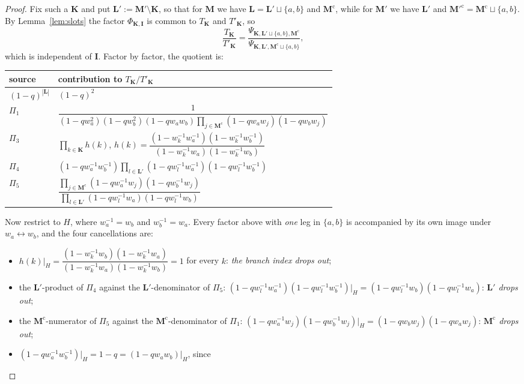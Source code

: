 \documentclass[11pt]{article}
\theoremstyle{plain}
\theoremstyle{definition}
\theoremstyle{remark}
\theoremstyle{plain}
\newcommand{\bI}{\mathbf{I}}
\newcommand{\bM}{\mathbf{M}}
\newcommand{\bK}{\mathbf{K}}
\newcommand{\bL}{\mathbf{L}}
\begin{document}
\begin{proof}
Fix such a $\bK$ and put $\bL':=\bM'\setminus\bK$, so that for $\bM$ we have
$\bL=\bL'\sqcup\{a,b\}$ and $\bM^{\mathrm c}$, while for $\bM'$ we have $\bL'$
and $\bM'^{\mathrm c}=\bM^{\mathrm c}\sqcup\{a,b\}$.  By
Lemma~\ref{lem:slots} the factor $\Phi_{\bK,\bI}$ is common to $T_{\bK}$ and
$T'_{\bK}$, so
\[
\frac{T_{\bK}}{T'_{\bK}}
=\frac{\Psi_{\bK,\bL'\sqcup\{a,b\},\bM^{\mathrm c}}}
      {\Psi_{\bK,\bL',\bM^{\mathrm c}\sqcup\{a,b\}}},
\]
which is independent of $\bI$.  Factor by factor, the quotient is:
\begin{center}
\begin{tabular}{@{}ll@{}}
\toprule
source & contribution to $T_{\bK}/T'_{\bK}$ \\
\midrule
$(1-q)^{|\bL|}$ & $(1-q)^2$ \\[1mm]
$\Pi_1$ &
$\dfrac{1}{(1-qw_a^2)(1-qw_b^2)(1-qw_aw_b)
 \prod_{j\in\bM^{\mathrm c}}(1-qw_aw_j)(1-qw_bw_j)}$ \\[3mm]
$\Pi_3$ & $\displaystyle\prod_{k\in\bK}h(k)$,\quad
$h(k)=\dfrac{(1-w_k^{-1}w_a^{-1})(1-w_k^{-1}w_b^{-1})}
            {(1-w_k^{-1}w_a)(1-w_k^{-1}w_b)}$ \\[3mm]
$\Pi_4$ & $(1-qw_a^{-1}w_b^{-1})\displaystyle\prod_{l\in\bL'}
 (1-qw_l^{-1}w_a^{-1})(1-qw_l^{-1}w_b^{-1})$ \\[3mm]
$\Pi_5$ & $\dfrac{\prod_{j\in\bM^{\mathrm c}}(1-qw_a^{-1}w_j)(1-qw_b^{-1}w_j)}
 {\prod_{l\in\bL'}(1-qw_l^{-1}w_a)(1-qw_l^{-1}w_b)}$ \\
\bottomrule
\end{tabular}
\end{center}
Now restrict to $H$, where $w_a^{-1}=w_b$ and $w_b^{-1}=w_a$.  Every factor
above with \emph{one} leg in $\{a,b\}$ is accompanied by its own image under
$w_a\leftrightarrow w_b$, and the four cancellations are:
\begin{itemize}
\item $h(k)\big|_H
 =\dfrac{(1-w_k^{-1}w_b)(1-w_k^{-1}w_a)}{(1-w_k^{-1}w_a)(1-w_k^{-1}w_b)}=1$ for
 every $k$: \emph{the branch index drops out};
\item the $\bL'$-product of $\Pi_4$ against the $\bL'$-denominator of $\Pi_5$:
 $(1-qw_l^{-1}w_a^{-1})(1-qw_l^{-1}w_b^{-1})\big|_H
 =(1-qw_l^{-1}w_b)(1-qw_l^{-1}w_a)$: \emph{$\bL'$ drops out};
\item the $\bM^{\mathrm c}$-numerator of $\Pi_5$ against the
 $\bM^{\mathrm c}$-denominator of $\Pi_1$:
 $(1-qw_a^{-1}w_j)(1-qw_b^{-1}w_j)\big|_H=(1-qw_bw_j)(1-qw_aw_j)$:
 \emph{$\bM^{\mathrm c}$ drops out};
\item $(1-qw_a^{-1}w_b^{-1})\big|_H=1-q=(1-qw_aw_b)\big|_H$, since

\end{itemize}
\end{proof}
\end{document}
